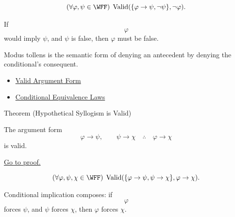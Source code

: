 \begin{remark*}
\[
(\forall\varphi,\psi\in\WFF)\;\operatorname{Valid}(\{\varphi\to\psi,\neg\psi\},\neg\varphi).
\]
\end{remark*}

\begin{remark*}
If \[
  \varphi
\] would imply \(\psi\), and \(\psi\) is false, then \(\varphi\) must be false.
\end{remark*}

\begin{remark*}[Interpretation]
Modus tollens is the semantic form of denying an antecedent by denying the
conditional's consequent.
\end{remark*}

\begin{dependencies}
\begin{itemize}
  \item \hyperref[def:valid-argument-form-propositional-logic]{Valid Argument Form}
  \item \hyperref[thm:conditional-equivalence-laws-propositional-logic]{Conditional Equivalence Laws}
\end{itemize}
\end{dependencies}

\begin{theorembox}{Theorem (Hypothetical Syllogism is Valid)}
\begin{theorem}
\label{thm:hypothetical-syllogism-validity-propositional-logic}
The argument form
\[
\varphi\to\psi,\qquad \psi\to\chi \quad\therefore\quad \varphi\to\chi
\]
is valid.

\noindent\hyperref[prf:hypothetical-syllogism-validity-propositional-logic]{Go to proof.}
\end{theorem}
\end{theorembox}

\begin{remark*}
\[
(\forall\varphi,\psi,\chi\in\WFF)\;\operatorname{Valid}(\{\varphi\to\psi,\psi\to\chi\},\varphi\to\chi).
\]
\end{remark*}

\begin{remark*}
Conditional implication composes: if \[
  \varphi
\] forces \(\psi\), and \(\psi\) forces \(\chi\), then \(\varphi\) forces \(\chi\).
\end{remark*}


